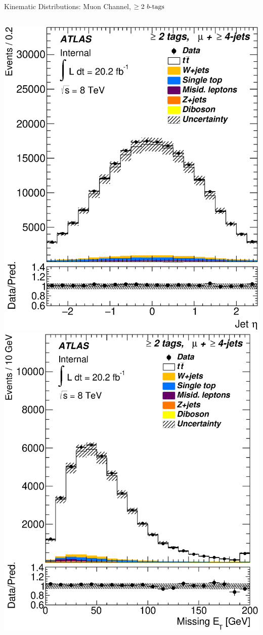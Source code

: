 \documentclass{beamer}
\begin{document}
{\begin{frame}{Kinematic Distributions: Muon Channel, $\geq2\text{ } \lowercase{ b\text{-tags}}$}
\begin{columns}
      \includegraphics[width=.95\textwidth]{../chapters/whel/figures/control_Plots2/bTag_2incl/JetEta_mu}
      \includegraphics[width=.95\textwidth]{../chapters/whel/figures/control_Plots2/bTag_2incl/MissingEt_mu}\\

\end{columns}
\end{frame}}
\end{document}
